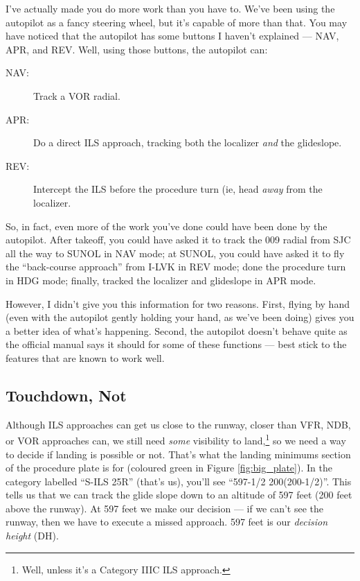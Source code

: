I've actually made you do more work than you have to.  We've been
using the autopilot as a fancy steering wheel, but it's capable of
more than that.  You may have noticed that the autopilot has some
buttons I haven't explained --- NAV, APR, and REV.  Well, using those
buttons, the autopilot can:

\begin{description}
\item[NAV:] Track a VOR radial.
\item[APR:] Do a direct ILS approach, tracking both the localizer
  \emph{and} the glideslope.
\item[REV:] Intercept the ILS before the procedure turn (ie, head
  \emph{away} from the localizer.
\end{description}

So, in fact, even more of the work you've done could have been done by
the autopilot.  After takeoff, you could have asked it to track the
009 radial from SJC all the way to SUNOL in NAV mode; at SUNOL, you
could have asked it to fly the ``back-course approach'' from I-LVK in
REV mode; done the procedure turn in HDG mode; finally, tracked the
localizer and glideslope in APR mode.

However, I didn't give you this information for two reasons.  First,
flying by hand (even with the autopilot gently holding your hand, as
we've been doing) gives you a better idea of what's happening.
Second, the autopilot doesn't behave quite as the official manual says
it should for some of these functions --- best stick to the features
that are known to work well.

\subsection{Touchdown, Not}


Although ILS approaches can get us close to the runway, closer than
VFR, NDB, or VOR approaches can, we still need \emph{some} visibility
to land,\footnote{Well, unless it's a Category IIIC ILS approach.} so
we need a way to decide if landing is possible or not.  That's what
the landing minimums section of the procedure plate is for (coloured
green in Figure \ref{fig:big_plate}).  In the category labelled
``S-ILS 25R'' (that's us), you'll see ``597-1/2 200(200-1/2)''.  This
tells us that we can track the glide slope down to an altitude of 597
feet (200 feet above the runway).  At 597 feet we make our decision
--- if we can't see the runway, then we have to execute a missed
approach.  597 feet is our \emph{decision height} (DH).

